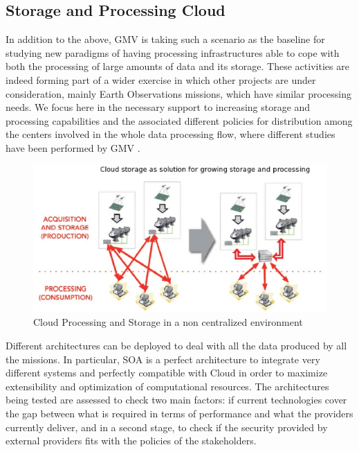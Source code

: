 \subsection{Storage and Processing Cloud}
In addition to the above, GMV is taking such a scenario as the baseline for studying  new paradigms of having processing infrastructures  able to cope with both the processing of large amounts of data and its storage. These activities  are indeed forming part of a wider exercise in which other projects are under consideration, mainly Earth Observations missions, which have similar processing needs. We focus here in the necessary support to increasing storage and processing capabilities and the associated different policies for distribution among the centers involved in the whole data processing flow, where different studies have been performed by GMV \citep{RubenPerez1}.
\begin{figure}[h]
\centering
\includegraphics[width=80 mm]{part10/Perez_P022/P022_f3.eps}
\caption{Cloud Processing and Storage in a non centralized environment}

\end{figure}
Different architectures can be deployed to deal with all the data produced by all the missions. In particular, SOA is a perfect architecture to integrate very different systems and perfectly compatible with Cloud in order to maximize extensibility and optimization of computational resources. The architectures being tested are assessed to check two main factors: if current technologies cover the gap between what is required in terms of performance and what the providers currently deliver, and in a second stage, to check if the security provided by external providers fits with the policies of the stakeholders.

